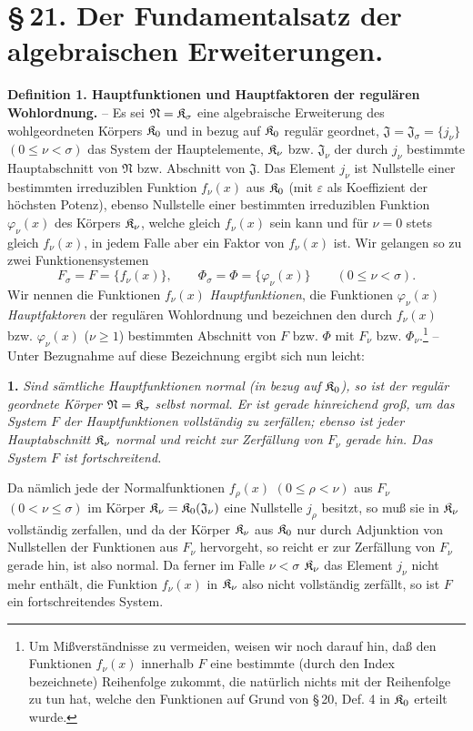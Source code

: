 \section*{\S\,21. Der Fundamentalsatz der algebraischen Erweiterungen.}

\textbf{Definition 1. Hauptfunktionen und Hauptfaktoren der regulären Wohlordnung.} -- Es sei $\mathfrak N=\mathfrak K_\sigma$ eine algebraische Erweiterung des wohlgeordneten Körpers $\mathfrak K_0$ und in bezug auf $\mathfrak K_0$ regulär geordnet, $\mathfrak J=\mathfrak J_\sigma=\{j_\nu\}$ $(0\leq\nu<\sigma)$ das System der Hauptelemente, $\mathfrak K_\nu$ bzw. $\mathfrak J_\nu$ der durch $j_\nu$ bestimmte Hauptabschnitt von $\mathfrak N$ bzw. Abschnitt von $\mathfrak J$. Das Element $j_\nu$ ist Nullstelle einer bestimmten irreduziblen Funktion $f_\nu(x)$ aus $\mathfrak K_0$ (mit $\varepsilon$ als Koeffizient der höchsten Potenz), ebenso Nullstelle einer bestimmten irreduziblen Funktion $\varphi_\nu(x)$ des Körpers $\mathfrak K_\nu$, welche gleich $f_\nu(x)$ sein kann und für $\nu=0$ stets gleich $f_\nu(x)$, in jedem Falle aber ein Faktor von $f_\nu(x)$ ist. Wir gelangen so zu zwei Funktionensystemen
\[
F_\sigma=F=\{f_\nu(x)\},\qquad \Phi_\sigma=\Phi=\{\varphi_\nu(x)\}\qquad (0\leq \nu<\sigma).
\]
Wir nennen die Funktionen $f_\nu(x)$ \emph{Hauptfunktionen}, die Funktionen $\varphi_\nu(x)$ \emph{Hauptfaktoren} der regulären Wohlordnung und bezeichnen den durch $f_\nu(x)$ bzw. $\varphi_\nu(x)$ ($\nu\geq1$) bestimmten Abschnitt von $F$ bzw. $\Phi$ mit $F_\nu$ bzw. $\Phi_\nu$.\footnote{Um Mißverständnisse zu vermeiden, weisen wir noch darauf hin, daß den Funktionen $f_\nu(x)$ innerhalb $F$ eine bestimmte (durch den Index bezeichnete) Reihenfolge zukommt, die natürlich nichts mit der Reihenfolge zu tun hat, welche den Funktionen auf Grund von \S\,20, Def. 4 in $\mathfrak K_0$ erteilt wurde.} -- Unter Bezugnahme auf diese Bezeichnung ergibt sich nun leicht:

\textbf{1.} \emph{Sind sämtliche Hauptfunktionen normal (in bezug auf $\mathfrak K_0$), so ist der regulär geordnete Körper $\mathfrak N=\mathfrak K_\sigma$ selbst normal. Er ist gerade hinreichend groß, um das System $F$ der Hauptfunktionen vollständig zu zerfällen; ebenso ist jeder Hauptabschnitt $\mathfrak K_\nu$ normal und reicht zur Zerfällung von $F_\nu$ gerade hin. Das System $F$ ist fortschreitend.}

Da nämlich jede der Normalfunktionen $f_\rho(x)$ $(0\leq \rho<\nu)$ aus $F_\nu$ $(0<\nu\leq\sigma)$ im Körper $\mathfrak K_\nu=\mathfrak K_0(\mathfrak J_\nu)$ eine Nullstelle $j_\rho$ besitzt, so muß sie in $\mathfrak K_\nu$ vollständig zerfallen, und da der Körper $\mathfrak K_\nu$ aus $\mathfrak K_0$ nur durch Adjunktion von Nullstellen der Funktionen aus $F_\nu$ hervorgeht, so reicht er zur Zerfällung von $F_\nu$ gerade hin, ist also normal. Da ferner im Falle $\nu<\sigma$ $\mathfrak K_\nu$ das Element $j_\nu$ nicht mehr enthält, die Funktion $f_\nu(x)$ in $\mathfrak K_\nu$ also nicht vollständig zerfällt, so ist $F$ ein fortschreitendes System.

